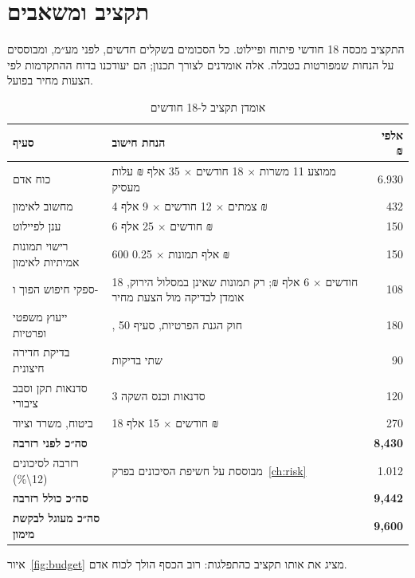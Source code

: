 \chapter{תקציב ומשאבים}\label{ch:budget}

התקציב מכסה \num{18} חודשי פיתוח ופיילוט. כל הסכומים בשקלים חדשים, לפני מע״מ, ומבוססים על הנחות שמפורטות בטבלה. אלה אומדנים לצורך תכנון; הם יעודכנו בדוח ההתקדמות לפי הצעות מחיר בפועל.

\begin{table}[!htb]\centering
\caption{אומדן תקציב ל-\num{18} חודשים}\label{tab:budget}
\begin{tabularx}{\linewidth}{@{}l Y r@{}}
\toprule
\textbf{סעיף} & \textbf{הנחת חישוב} & \textbf{אלפי ₪} \\
\midrule
כוח אדם & ממוצע \num{11} משרות $\times$ \num{18} חודשים $\times$ \num{35} אלף ₪ עלות מעסיק & \num{6,930} \\
מחשוב  לאימון & \num{4} צמתים $\times$ \num{12} חודשים $\times$ \num{9} אלף ₪ & \num{432} \\
ענן לפיילוט & \num{6} חודשים $\times$ \num{25} אלף ₪ & \num{150} \\
רישוי תמונות אמיתיות לאימון & \num{600} אלף תמונות $\times$ \num{0.25} ₪ & \num{150} \\
ספקי חיפוש הפוך ו- & \num{18} חודשים $\times$ \num{6} אלף ₪; רק תמונות שאינן במסלול הירוק, אומדן לבדיקה מול הצעת מחיר & \num{108} \\
ייעוץ משפטי ופרטיות & , חוק הגנת הפרטיות, סעיף \num{50} & \num{180} \\
בדיקת חדירה חיצונית & שתי בדיקות & \num{90} \\
סדנאות תקן וסבב ציבורי & \num{3} סדנאות וכנס השקה & \num{120} \\
ביטוח, משרד וציוד & \num{18} חודשים $\times$ \num{15} אלף ₪ & \num{270} \\
\midrule
\textbf{סה״כ לפני רזרבה} & & \textbf{8,430} \\
רזרבה לסיכונים (\num{12\%}) & מבוססת על חשיפת הסיכונים בפרק~\ref{ch:risk} & \num{1,012} \\
\textbf{סה״כ כולל רזרבה} & & \textbf{9,442} \\
\textbf{סה״כ מעוגל לבקשת מימון} & & \textbf{9,600} \\
\bottomrule
\end{tabularx}
\end{table}

איור~\ref{fig:budget} מציג את אותו תקציב כהתפלגות: רוב הכסף הולך לכוח אדם.


